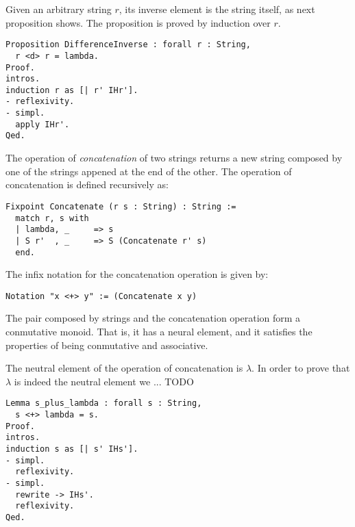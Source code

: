 Given an arbitrary string $r$, its inverse element is the string itself, as next proposition shows. The proposition is proved by induction over $r$.

\begin{sourcecode}
{\scriptsize \begin{verbatim}
Proposition DifferenceInverse : forall r : String,
  r <d> r = lambda.
Proof.
intros.
induction r as [| r' IHr'].
- reflexivity.
- simpl.
  apply IHr'.
Qed.
\end{verbatim}}
\end{sourcecode}

The operation of \emph{concatenation} of two strings returns a new string composed by one of the strings appened at the end of the other. The operation of concatenation is defined recursively as:

\begin{sourcecode}
{\scriptsize \begin{verbatim}
Fixpoint Concatenate (r s : String) : String :=
  match r, s with
  | lambda, _     => s
  | S r'  , _     => S (Concatenate r' s)
  end.
\end{verbatim}}
\end{sourcecode}

The infix notation for the concatenation operation is given by:

\begin{sourcecode}
{\scriptsize \begin{verbatim}
Notation "x <+> y" := (Concatenate x y)
\end{verbatim}}
\end{sourcecode}

The pair composed by strings and the concatenation operation form a conmutative monoid. That is, it has a neural element, and it satisfies the properties of being conmutative and associative.

The neutral element of the operation of concatenation is $\lambda$. In order to prove that $\lambda$ is indeed the neutral element we ... {\color{red} TODO}

\begin{sourcecode}
{\scriptsize \begin{verbatim}
Lemma s_plus_lambda : forall s : String,
  s <+> lambda = s.
Proof.
intros.
induction s as [| s' IHs'].
- simpl.
  reflexivity.
- simpl.
  rewrite -> IHs'.
  reflexivity.
Qed.
\end{verbatim}}
\end{sourcecode}

